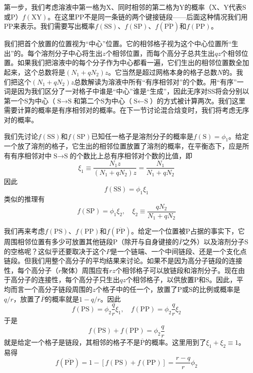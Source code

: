 \documentclass[main.tex]{subfiles}
\begin{document}
第一步，我们考虑溶液中第一格为X、同时相邻的第二格为Y的概率（X、Y代表S或P）$f\left(\text{XY}\right)$。在这里PP不是同一条链的两个键接链段——后面这种情况我们用$\overline{\text{PP}}$来表示。我们需要写出概率$f\left(\text{SS}\right)$、$f\left(\text{SP}\right)$、$f\left(\overline{\text{PP}}\right)$和$f\left(\text{PP}\right)$。

我们把首个放置的位置视为“中心”位置。它的相邻格子视为这个中心位置所“生出”的。每个溶剂分子中心将生出$z$个相邻位置，而每个高分子总共生出$qz$个相邻位置。如果我们把溶液中的每个分子作为中心都看一遍，它们生出的相邻位置数全加起来，这个总数将是$\left(N_1+qN_2\right)z$。它当然是超过网格本身的格子总数$N$的。我们把这个$\left(N_1+qN_2\right)z$总数解读为溶液中所有“有序相邻对”的个数。用“有序”一词是因为我们区分了一对格子中谁是“中心”谁是“生成”，因此无序对SS将会分别以第一个S为中心（$\text{S}\rightarrow\text{S}$和第二个S为中心（$\text{S}\leftarrow\text{S}$）的方式被计算两次。我们这里需要计算的概率是有序相邻对的概率。在下一节讨论混合焓变时，我们将考虑无序对的概率。

我们先讨论$f\left(\text{SS}\right)$和$f\left(\text{SP}\right)$已知任一格子是溶剂分子的概率是$f\left(\text{S}\right)=\phi_1$。给定一个放了溶剂的格子，它生出的相邻位置放置了溶剂的概率，在平衡态下，应是所有有序相邻对中$\text{S}\rightarrow\text{S}$的个数比上总有序相邻对个数的比值，即
\[\xi_1\equiv\frac{N_1 z}{\left(N_1+qN_2\right)z}=\frac{N_1}{N_1+qN_2}\]
因此
\[f\left(\text{SS}\right)=\phi_1\xi_1\]
类似的推理有
\[f\left(\text{SP}\right)=\phi_1\xi_2,\quad \xi_2\equiv\frac{qN_2}{N_1+qN_2}\]

我们再来考虑$f\left(\text{PS}\right)$、$f\left(\text{PP}\right)$和$f\left(\overline{\text{PP}}\right)$。给定一个位置被P占据的事实下，它周围相邻位置有多少可放置其他链段P（除开与自身键接的$\overline{P}$之外）以及溶剂分子S的空格呢？这似乎还要取决于这个$P$是一个链端、一个中间链段、还是一个支化点链段。但我们用整个高分子的平均结果来讨论。如果不是因为高分子链段的连接性，每个高分子（$r$聚体）周围应有$rz$个相邻格子可以放链段和溶剂分子。现在由于高分子的连接性，每个高分子只生出$qz$个相邻格子，以供放置P和S。因此，平均而言一个高分子链段周围的$z$个格子中的任一个，放置了P或S的比例或概率是$q/r$，放置了$\overline{P}$的概率就是$1-q/r$。因此
\[f\left(\text{PS}\right)=\phi_2\frac{q}{r}\xi_1,\quad f\left(\text{PP}\right)=\phi_2\frac{q}{r}\xi_2\]
于是
\[f\left(\text{PS}\right)+f\left(\text{PP}\right)=\phi_2\frac{q}{r}\]
就是给定一个格子是链段，其相邻的格子不是$\overline{\text{P}}$的概率。这里用到了$\xi_1+\xi_2\equiv 1$。易得
\[f\left(\overline{\text{PP}}\right)=1-\left[f\left(\text{PS}\right)+f\left(\text{PP}\right)\right]=\frac{r-q}{r}\phi_2\]
\end{document}
